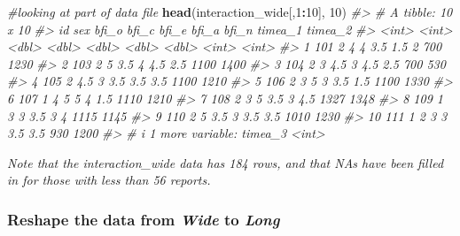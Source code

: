 \documentclass[
]{book}
\newenvironment{Shaded}{\begin{snugshade}}{\end{snugshade}}
\newcommand{\CommentTok}[1]{\textcolor[rgb]{0.56,0.35,0.01}{\textit{#1}}}
\newcommand{\DecValTok}[1]{\textcolor[rgb]{0.00,0.00,0.81}{#1}}
\newcommand{\FunctionTok}[1]{\textcolor[rgb]{0.13,0.29,0.53}{\textbf{#1}}}
\newcommand{\NormalTok}[1]{#1}
\newcommand{\SpecialCharTok}[1]{\textcolor[rgb]{0.81,0.36,0.00}{\textbf{#1}}}
\theoremstyle{definition}
\theoremstyle{definition}
\theoremstyle{definition}
\theoremstyle{definition}
\theoremstyle{remark}
\begin{document}
\begin{Shaded}
\begin{Highlighting}[]
\CommentTok{\#looking at part of data file}
\FunctionTok{head}\NormalTok{(interaction\_wide[,}\DecValTok{1}\SpecialCharTok{:}\DecValTok{10}\NormalTok{], }\DecValTok{10}\NormalTok{)}
\CommentTok{\#\textgreater{} \# A tibble: 10 x 10}
\CommentTok{\#\textgreater{}       id   sex bfi\_o bfi\_c bfi\_e bfi\_a bfi\_n timea\_1 timea\_2}
\CommentTok{\#\textgreater{}    \textless{}int\textgreater{} \textless{}int\textgreater{} \textless{}dbl\textgreater{} \textless{}dbl\textgreater{} \textless{}dbl\textgreater{} \textless{}dbl\textgreater{} \textless{}dbl\textgreater{}   \textless{}int\textgreater{}   \textless{}int\textgreater{}}
\CommentTok{\#\textgreater{}  1   101     2   4     4     3.5   1.5   2       700    1230}
\CommentTok{\#\textgreater{}  2   103     2   5     3.5   4     4.5   2.5    1100    1400}
\CommentTok{\#\textgreater{}  3   104     2   3     4.5   3     4.5   2.5     700     530}
\CommentTok{\#\textgreater{}  4   105     2   4.5   3     3.5   3.5   3.5    1100    1210}
\CommentTok{\#\textgreater{}  5   106     2   3     5     3     3.5   1.5    1100    1330}
\CommentTok{\#\textgreater{}  6   107     1   4     5     5     4     1.5    1110    1210}
\CommentTok{\#\textgreater{}  7   108     2   3     5     3.5   3     4.5    1327    1348}
\CommentTok{\#\textgreater{}  8   109     1   3     3     3.5   3     4      1115    1145}
\CommentTok{\#\textgreater{}  9   110     2   5     3.5   3     3.5   3.5    1010    1230}
\CommentTok{\#\textgreater{} 10   111     1   2     3     3     3.5   3.5     930    1200}
\CommentTok{\#\textgreater{} \# i 1 more variable: timea\_3 \textless{}int\textgreater{}}
\end{Highlighting}
\end{Shaded}

\emph{Note that the interaction\_wide data has 184 rows, and that NAs have been filled in for those with less than 56 reports.}

\subsubsection{\texorpdfstring{Reshape the data from \emph{Wide} to \emph{Long}}{Reshape the data from Wide to Long}}\label{reshape-the-data-from-wide-to-long}
\end{document}
